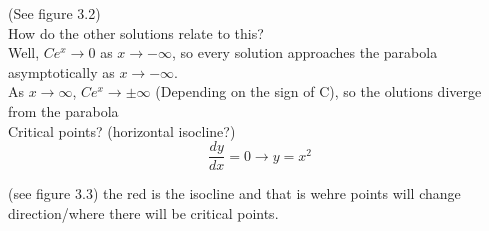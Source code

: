 \documentclass[12pt]{article}
\begin{document}
	(See figure 3.2)\\
	
	How do the other solutions relate to this?\\
	Well, $Ce^x \rightarrow 0$ as $x \rightarrow -\infty$, so every solution approaches the parabola asymptotically as $x \rightarrow -\infty$.\\
	As $x \rightarrow \infty$, $Ce^x \rightarrow \pm \infty$ (Depending on the sign of C), so the olutions diverge from the parabola\\
	
	Critical points? (horizontal isocline?)\\
	$$\frac{dy}{dx} = 0 \rightarrow y = x^2$$
	
	(see figure 3.3) the red is the isocline and that is wehre points will change direction/where there will be critical points. 
	
	
	
\end{document}
